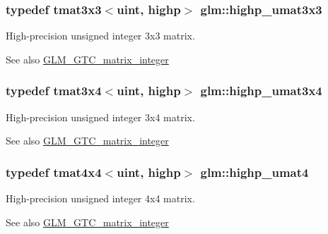 \subsubsection[{highp\+\_\+umat3x3}]{\setlength{\rightskip}{0pt plus 5cm}typedef tmat3x3$<${\bf uint}, highp$>$ {\bf glm\+::highp\+\_\+umat3x3}}\label{group__gtc__matrix__integer_ga770b01686af4fbbb13bbd7bd97d60fe4}
High-\/precision unsigned integer 3x3 matrix. \begin{DoxySeeAlso}{See also}
\hyperlink{group__gtc__matrix__integer}{G\+L\+M\+\_\+\+G\+T\+C\+\_\+matrix\+\_\+integer} 
\end{DoxySeeAlso}
\hypertarget{group__gtc__matrix__integer_gaa2fb29026c9c80c7d17b5389e36d6aa7}{}
\subsubsection[{highp\+\_\+umat3x4}]{\setlength{\rightskip}{0pt plus 5cm}typedef tmat3x4$<${\bf uint}, highp$>$ {\bf glm\+::highp\+\_\+umat3x4}}\label{group__gtc__matrix__integer_gaa2fb29026c9c80c7d17b5389e36d6aa7}
High-\/precision unsigned integer 3x4 matrix. \begin{DoxySeeAlso}{See also}
\hyperlink{group__gtc__matrix__integer}{G\+L\+M\+\_\+\+G\+T\+C\+\_\+matrix\+\_\+integer} 
\end{DoxySeeAlso}
\hypertarget{group__gtc__matrix__integer_ga7b0e78c54432c7236d8b96473b7423ec}{}
\subsubsection[{highp\+\_\+umat4}]{\setlength{\rightskip}{0pt plus 5cm}typedef tmat4x4$<${\bf uint}, highp$>$ {\bf glm\+::highp\+\_\+umat4}}\label{group__gtc__matrix__integer_ga7b0e78c54432c7236d8b96473b7423ec}
High-\/precision unsigned integer 4x4 matrix. \begin{DoxySeeAlso}{See also}
\hyperlink{group__gtc__matrix__integer}{G\+L\+M\+\_\+\+G\+T\+C\+\_\+matrix\+\_\+integer} 
\end{DoxySeeAlso}
\hypertarget{group__gtc__matrix__integer_ga4015bf99a981bf271fd516f9b2cb6724}{}
